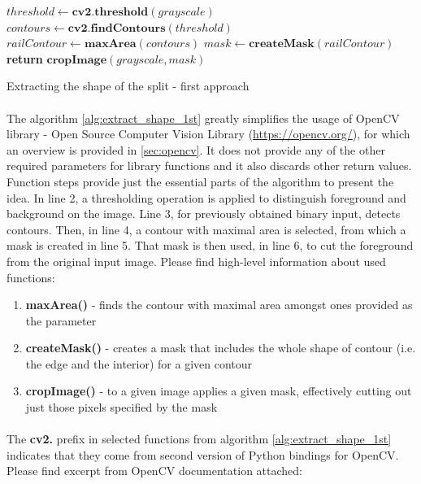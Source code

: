 \begin{algorithm}
	\begin{spacing}{1.5}
	\begin{algorithmic}[1]
			\State $threshold \gets \textbf{cv2.threshold}(grayscale)$
			\State $contours \gets \textbf{cv2.findContours}(threshold)$
			\State $railContour \gets \textbf{maxArea}(contours)$
			\State $mask \gets \textbf{createMask}(railContour)$
			\State \textbf{return} $\textbf{cropImage}(grayscale, mask)$
		\EndFunction
	\end{algorithmic}
	\end{spacing}
	\caption{Extracting the shape of the split - first approach}
	\label{alg:extract_shape_1st}
\end{algorithm}

\paragraph{}
The algorithm \ref{alg:extract_shape_1st} greatly simplifies the usage of OpenCV library - Open Source Computer Vision Library (\url{https://opencv.org/}), for which an overview is provided in \autoref{sec:opencv}. It does not provide any of the other required parameters for library functions and it also discards other return values. Function steps provide just the essential parts of the algorithm to present the idea. In line 2, a thresholding operation is applied to distinguish foreground and background on the image. Line 3, for previously obtained binary input, detects contours. Then, in line 4, a contour with maximal area is selected, from which a mask is created in line 5. That mask is then used, in line 6, to cut the foreground from the original input image. Please find high-level information about used functions:

\begin{enumerate}
	\item \textbf{maxArea()} - finds the contour with maximal area amongst ones provided as the parameter
	\item \textbf{createMask()} - creates a mask that includes the whole shape of contour (i.e. the edge and the interior) for a given contour
	\item \textbf{cropImage()} - to a given image applies a given mask, effectively cutting out just those pixels specified by the mask 
\end{enumerate}

\paragraph{}
The \textbf{cv2.} prefix in selected functions from algorithm \ref{alg:extract_shape_1st} indicates that they come from second version of Python bindings for OpenCV. Please find excerpt from OpenCV documentation attached: \cite{opencv-docs}

